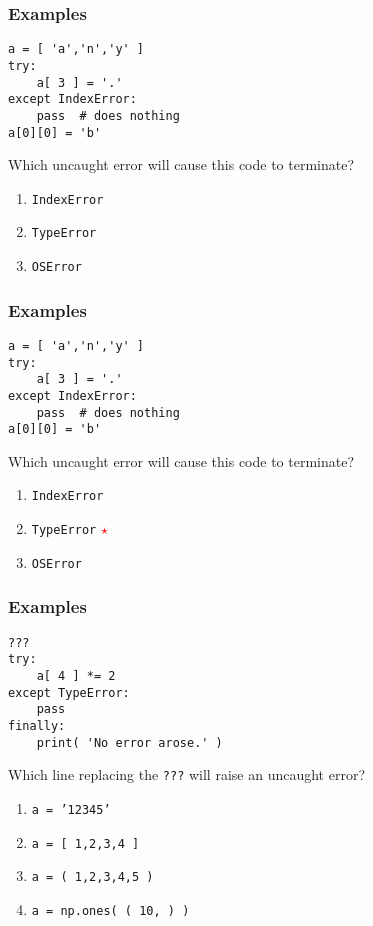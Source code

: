 \documentclass[11pt]{beamer}
\newcommand{\correctstar}{{\Large\textcolor{red}{$\star$}}}
\begin{document}
\begin{frame}[fragile]
  \frametitle{Examples}
  \Enlarge

  \begin{Verbatim}
a = [ 'a','n','y' ]
try:
    a[ 3 ] = '.'
except IndexError:
    pass  # does nothing
a[0][0] = 'b'
  \end{Verbatim}

  Which uncaught error will cause this code to terminate?

  \begin{enumerate}[label=\Alph*]
    \item  \texttt{IndexError}
    \item  \texttt{TypeError}
    \item  \texttt{OSError}
  \end{enumerate}
\end{frame}

\begin{frame}[fragile]
  \frametitle{Examples}
  \Enlarge

  \begin{Verbatim}
a = [ 'a','n','y' ]
try:
    a[ 3 ] = '.'
except IndexError:
    pass  # does nothing
a[0][0] = 'b'
  \end{Verbatim}

  Which uncaught error will cause this code to terminate?

  \begin{enumerate}[label=\Alph*]
    \item  \texttt{IndexError}
    \item  \texttt{TypeError}  \correctstar
    \item  \texttt{OSError}
  \end{enumerate}
\end{frame}

\begin{frame}[fragile]
  \frametitle{Examples}
  \Enlarge

  \begin{Verbatim}
???
try:
    a[ 4 ] *= 2
except TypeError:
    pass
finally:
    print( 'No error arose.' )
  \end{Verbatim}

  Which line replacing the \texttt{???} will raise an uncaught error?

  \begin{enumerate}[label=\Alph*]
    \item  \texttt{a = '12345'}
    \item  \texttt{a = [ 1,2,3,4 ]}
    \item  \texttt{a = ( 1,2,3,4,5 )}
    \item  \texttt{a = np.ones( ( 10, ) )}
  \end{enumerate}
\end{frame}
\end{document}
